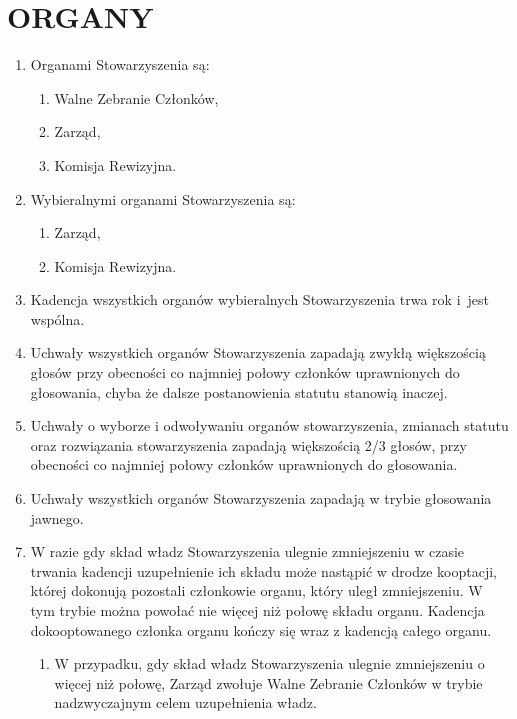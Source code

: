 \documentclass{article}
\begin{document}
\section{ORGANY}
  \begin{enumerate}
    \item Organami Stowarzyszenia są:
      \begin{enumerate}
        \item Walne Zebranie Członków,
        \item Zarząd,
        \item Komisja Rewizyjna.
      \end{enumerate}
    \item Wybieralnymi organami Stowarzyszenia są:
      \begin{enumerate}
        \item Zarząd,
        \item Komisja Rewizyjna.
      \end{enumerate}
    \item Kadencja wszystkich organów wybieralnych Stowarzyszenia trwa rok i~jest wspólna.
    \item Uchwały wszystkich organów Stowarzyszenia zapadają zwykłą większością głosów przy obecności co najmniej połowy członków uprawnionych do głosowania, chyba że dalsze postanowienia statutu stanowią inaczej.
    \item Uchwały o wyborze i odwoływaniu organów stowarzyszenia, zmianach statutu oraz rozwiązania stowarzyszenia zapadają większością 2/3 głosów, przy obecności co najmniej połowy członków uprawnionych do głosowania.
    \item Uchwały wszystkich organów Stowarzyszenia zapadają w trybie głosowania jawnego.
    \item W razie gdy skład władz Stowarzyszenia ulegnie zmniejszeniu w czasie trwania kadencji uzupełnienie ich składu może nastąpić w drodze kooptacji, której dokonują pozostali członkowie organu, który uległ zmniejszeniu. W tym trybie można powołać nie więcej niż połowę składu organu. Kadencja dokooptowanego członka organu kończy się wraz z kadencją całego organu.
    \begin{enumerate}
    	\item W przypadku, gdy skład władz Stowarzyszenia ulegnie zmniejszeniu o więcej niż połowę, Zarząd zwołuje Walne Zebranie Członków w trybie nadzwyczajnym celem uzupełnienia władz.
    \end{enumerate}

\end{enumerate}
\end{document}
